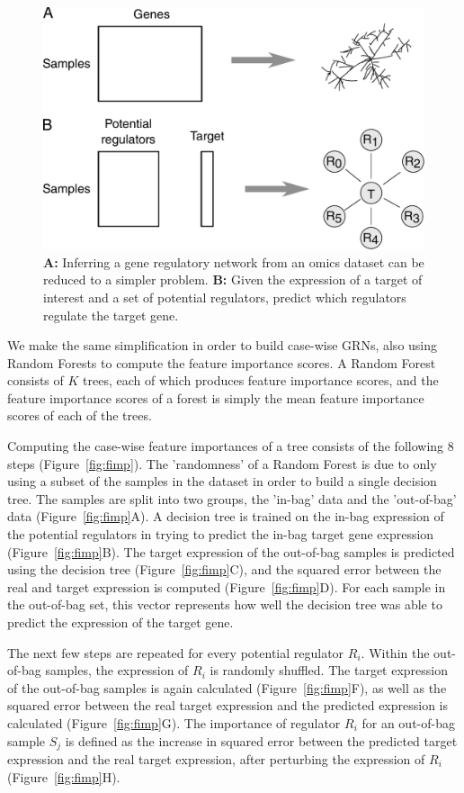 \begin{figure}[htb!]
	\centering
	\includegraphics[width=.6\linewidth]{fig/methodology/simplify.pdf} 
	\caption{
		\textbf{A:} Inferring a gene regulatory network from an omics dataset can be reduced to a simpler problem. 
		\textbf{B:} Given the expression of a target of interest and a set of potential regulators, predict which regulators regulate the target gene.
	}
	\label{fig:simplify}
\end{figure}

We make the same simplification in order to build case-wise GRNs, also using Random Forests to compute the feature importance scores. A Random Forest consists of $K$ trees, each of which produces feature importance scores, and the feature importance scores of a forest is simply the mean feature importance scores of each of the trees. 

Computing the case-wise feature importances of a tree consists of the following 8 steps (Figure~\ref{fig:fimp}).
The 'randomness' of a Random Forest is due to only using a subset of the samples in the dataset in order to build a single decision tree. The samples are split into two groups, the 'in-bag' data and the 'out-of-bag' data (Figure~\ref{fig:fimp}A). A decision tree\cite{breiman_classificationregressiontrees_1984} is trained on the in-bag expression of the potential regulators in trying to predict the in-bag target gene expression (Figure~\ref{fig:fimp}B). The target expression of the out-of-bag samples is predicted using the decision tree (Figure~\ref{fig:fimp}C), and the squared error between the real and target expression is computed (Figure~\ref{fig:fimp}D). For each sample in the out-of-bag set, this vector represents how well the decision tree was able to predict the expression of the target gene.

The next few steps are repeated for every potential regulator $R_i$. Within the out-of-bag samples, the expression of $R_i$ is randomly shuffled. The target expression of the out-of-bag samples is again calculated (Figure~\ref{fig:fimp}F), as well as the squared error between the real target expression and the predicted expression is calculated (Figure~\ref{fig:fimp}G). The importance of regulator $R_i$ for an out-of-bag sample $S_j$ is defined as the increase in squared error between the predicted target expression and the real target expression, after perturbing the expression of $R_i$ (Figure~\ref{fig:fimp}H). 

